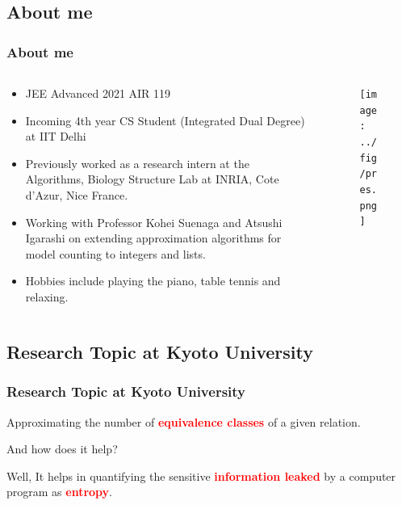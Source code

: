 \documentclass[
	11pt, %
]{beamer}
\begin{document}

\subsection{About me}
\begin{frame}
	\frametitle{About me}
\begin{columns}
	\begin{column}{0.675\textwidth}
		\begin{itemize}
			\item JEE Advanced 2021 AIR 119
			\item Incoming 4th year CS Student (Integrated Dual Degree) at IIT Delhi
			\item Previously worked as a research intern at the Algorithms, Biology Structure Lab at INRIA, Cote d'Azur, Nice France.
			\item Working with Professor Kohei Suenaga and Atsushi Igarashi on extending approximation algorithms for model counting to integers and lists.
			\item Hobbies include playing the piano, table tennis and relaxing.
		\end{itemize}
	\end{column}
	\begin{column}{0.325\textwidth}
	    \begin{figure}
	    \centering
		\texttt{[image: ../fig/pres.png]}
	    \end{figure}
	\end{column}
\end{columns}
	
\end{frame}

\subsection{Research Topic at Kyoto University}
\begin{frame}
	\frametitle{Research Topic at Kyoto University}
	Approximating the number of \textcolor{red}{\textbf{equivalence classes}} of a given relation.
	\pause
	\vspace{1cm}
	\begin{center}
	And how does it help? 
	\end{center}
	\pause
	\vspace{1cm}

	\begin{center}
	Well, It helps in quantifying the sensitive \textcolor{red}{\textbf{information leaked}} by a computer program as \textcolor{red}{\textbf{entropy}}.
	\end{center}



\end{frame}
	
\end{document}
